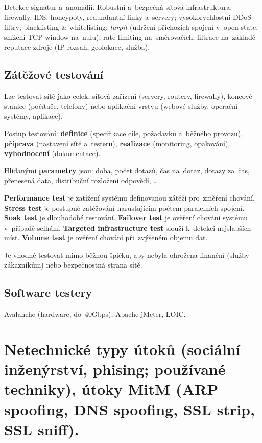 Detekce signatur a~anomálií. Robustní a~bezpečná síťová infrastruktura; firewally, IDS, honeypoty, redundantní linky a~servery; vysokorychlostní DDoS filtry; blacklisting \& whitelisting; \emph{tarpit} (udržení příchozích spojení v~open-state, snížení TCP window na~nulu); rate limiting na~směrovačích; filtrace na~základě reputace zdroje (IP rozsah, geolokace, služba).

\subsection{Zátěžové testování}

Lze testovat sítě jako celek, síťová zařízení (servery, routery, firewally), koncové stanice (počítače, telefony) nebo aplikační vrstvu (webové služby, operační systémy, aplikace).

Postup testování: \textbf{definice} (specifikace cíle, požadavků a~běžného provozu), \textbf{příprava} (nastavení sítě a~testeru), \textbf{realizace} (monitoring, opakování), \textbf{vyhodnocení} (dokumentace).

Hlídanými \textbf{parametry} jsou: doba, počet dotazů, čas na~dotaz, dotazy za~čas, přenesená data, distribuční rozložení odpovědí, \dots

\textbf{Performance test} je zatížení systému definovanou zátěží pro~změření chování. \textbf{Stress test} je postupné zatěžování narůstajícím počtem paralelních spojení. \textbf{Soak test} je dlouhodobé testování. \textbf{Failover test} je ověření chování systému v~případě selhání. \textbf{Targeted infrastructure test} slouží k~detekci nejslabších míst. \textbf{Volume test} je ověření chování při~zvýšeném objemu dat.

Je vhodné testovat mimo běžnou špičku, aby nebyla ohrožena finanční (služby zákazníkům) nebo bezpečnostná strana sítě.

\subsection{Software testery}

Avalanche (hardware, do~40Gbps), Apache jMeter, LOIC.

\clearpage
\section{Netechnické typy útoků (sociální inženýrství, phising; používané techniky), útoky MitM (ARP spoofing, DNS spoofing, SSL strip, SSL sniff).}

